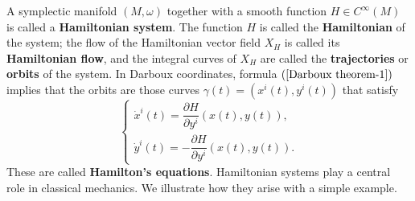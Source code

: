 A symplectic manifold $(M,\omega)$ together with a smooth function $H\in C^\infty(M)$ is called a \textbf{Hamiltonian system}. The function $H$ is called the \textbf{Hamiltonian} of the system; the flow of the Hamiltonian vector field $X_H$ is called its \textbf{Hamiltonian flow}, and the integral curves of $X_H$ are called the \textbf{trajectories} or \textbf{orbits} of the system. In Darboux coordinates, formula $(\ref{Darboux theorem-1})$ implies that the orbits are those curves $\gamma(t)=(x^i(t),y^i(t))$ that satisfy
\begin{equation}\label{Hamilton's equations}
\left\{
\begin{array}{l}
\dot{x}^i(t)=\dfrac{\partial H}{\partial y^i}(x(t),y(t)),\\[8pt]
\dot{y}^i(t)=-\dfrac{\partial H}{\partial y^i}(x(t),y(t)).
\end{array}
\right.
\end{equation}
These are called \textbf{Hamilton's equations}. Hamiltonian systems play a central role in classical mechanics. We illustrate how they arise with a simple example.

